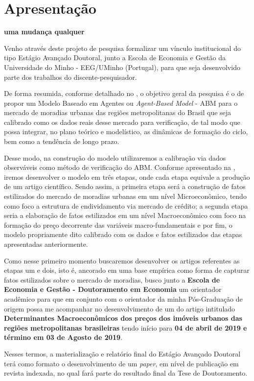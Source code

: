 \section{Apresentação}




\textbf{uma mudança qualquer}

Venho através deste projeto de pesquisa formalizar um vínculo institucional do tipo Estágio Avançado Doutoral, junto a Escola de Economia e Gestão da Universidade do Minho - EEG/UMinho (Portugal), para que seja desenvolvido parte dos trabalhos do discente-pesquisador.


De forma resumida, conforme detalhado no , o objetivo geral da pesquisa é o de propor um Modelo Baseado em Agentes ou \textit{Agent-Based Model} - ABM para o mercado de moradias urbanas das regiões metropolitanas do Brasil que seja calibrado como os dados reais desse mercado para verificação, de tal modo que possa integrar, no plano teórico e modelístico, as dinâmicas de formação do ciclo, bem como a tendência de longo prazo.

Desse modo, na construção do modelo utilizaremos a calibração via dados observáveis como método de verificação do ABM. Conforme apresentado na , iremos desenvolver o modelo em três etapas, onde cada etapa equivale a produção de um artigo científico. Sendo assim, a primeira etapa será a construção de fatos estilizados do mercado de moradias urbanas em um nível Microeconômico, tendo como foco a estrutura de endividamento via mercado de crédito; a segunda etapa seria a elaboração de fatos estilizados em um nível Macroeconômico com foco na formação do preço decorrente das variáveis macro-fundamentais e por fim, o modelo propriamente dito calibrado com os dados e fatos estilizados das etapas apresentadas anteriormente.

Como nesse primeiro momento buscaremos desenvolver os artigos referentes as etapas um e dois, isto é, ancorado em uma base empírica como forma de capturar fatos estilizados sobre o mercado de moradias, busco junto a \textbf{Escola de Economia e Gestão - Doutoramento em Economia} um orientador acadêmico para que em conjunto com o orientador da minha Pós-Graduação de origem possa me acompanhar no desenvolvimento de um do artigo intitulado \textbf{Determinantes Macroeconômicos dos preços dos imóveis urbanos das regiões metropolitanas brasileiras} tendo início para\textbf{ 04 de abril de 2019 e término em 03 de Agosto de 2019}.

Nesses termos, a materialização e relatório final do Estágio Avançado Doutoral terá como formato o desenvolvimento de um \textit{paper}, em nível de publicação em revista indexada, no qual fará parte do resultado final da Tese de Doutoramento.